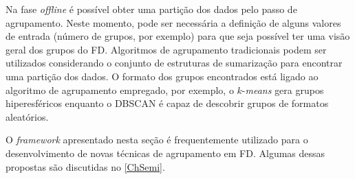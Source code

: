 Na fase \emph{offline} é possível obter uma partição dos dados pelo passo de agrupamento. Neste momento, pode ser necessária a definição de alguns valores de entrada (número de grupos, por exemplo) para que seja possível ter uma visão geral dos grupos do FD. Algoritmos de agrupamento tradicionais podem ser utilizados considerando o conjunto de estruturas de sumarização para encontrar uma partição dos dados. O formato dos grupos encontrados está ligado ao algoritmo de agrupamento empregado, por exemplo, o $k$-\emph{means} \cite{macqueen1967} gera grupos hiperesféricos enquanto o DBSCAN \cite{Ester1996} é capaz de descobrir grupos de formatos aleatórios.

O \emph{framework} apresentado nesta seção é frequentemente utilizado para o desenvolvimento de novas técnicas de agrupamento em FD. Algumas dessas propostas são discutidas no \autoref{ChSemi}.